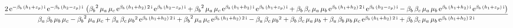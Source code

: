 \documentclass[9pt]{article}
\begin{document}
  \begin{equation}
    \centering
    \frac{2\, \mathrm{e}^{- \mathrm{\beta}_{b}\, \left(h_{1} + z_{p}\right)\, \mathrm{i}}\, \mathrm{e}^{- \mathrm{\beta}_{b}\, \left(h_{2} - z_{p}\right)\, \mathrm{i}}\, \left({\mathrm{\beta}_{b}}^2\, \mathrm{\mu}_{a}\, \mathrm{\mu}_{c}\, \mathrm{e}^{\mathrm{\beta}_{b}\, \left(h_{1} + h_{2}\right)\, 2\, \mathrm{i}}\, \mathrm{e}^{\mathrm{\beta}_{b}\, \left(h_{2} - z_{p}\right)\, \mathrm{i}} + {\mathrm{\beta}_{b}}^2\, \mathrm{\mu}_{a}\, \mathrm{\mu}_{c}\, \mathrm{e}^{\mathrm{\beta}_{b}\, \left(h_{1} + h_{2}\right)\, \mathrm{i}}\, \mathrm{e}^{\mathrm{\beta}_{b}\, \left(h_{1} + z_{p}\right)\, \mathrm{i}} + \mathrm{\beta}_{b}\, \mathrm{\beta}_{c}\, \mathrm{\mu}_{a}\, \mathrm{\mu}_{b}\, \mathrm{e}^{\mathrm{\beta}_{b}\, \left(h_{1} + h_{2}\right)\, 2\, \mathrm{i}}\, \mathrm{e}^{\mathrm{\beta}_{b}\, \left(h_{2} - z_{p}\right)\, \mathrm{i}} - \mathrm{\beta}_{b}\, \mathrm{\beta}_{c}\, \mathrm{\mu}_{a}\, \mathrm{\mu}_{b}\, \mathrm{e}^{\mathrm{\beta}_{b}\, \left(h_{1} + h_{2}\right)\, \mathrm{i}}\, \mathrm{e}^{\mathrm{\beta}_{b}\, \left(h_{1} + z_{p}\right)\, \mathrm{i}}\right)}{\mathrm{\beta}_{a}\, \mathrm{\beta}_{b}\, \mathrm{\mu}_{b}\, \mathrm{\mu}_{c} - {\mathrm{\beta}_{b}}^2\, \mathrm{\mu}_{a}\, \mathrm{\mu}_{c} + \mathrm{\beta}_{a}\, \mathrm{\beta}_{c}\, {\mathrm{\mu}_{b}}^2\, \mathrm{e}^{\mathrm{\beta}_{b}\, \left(h_{1} + h_{2}\right)\, 2\, \mathrm{i}} + {\mathrm{\beta}_{b}}^2\, \mathrm{\mu}_{a}\, \mathrm{\mu}_{c}\, \mathrm{e}^{\mathrm{\beta}_{b}\, \left(h_{1} + h_{2}\right)\, 2\, \mathrm{i}} - \mathrm{\beta}_{a}\, \mathrm{\beta}_{c}\, {\mathrm{\mu}_{b}}^2 + \mathrm{\beta}_{b}\, \mathrm{\beta}_{c}\, \mathrm{\mu}_{a}\, \mathrm{\mu}_{b} + \mathrm{\beta}_{a}\, \mathrm{\beta}_{b}\, \mathrm{\mu}_{b}\, \mathrm{\mu}_{c}\, \mathrm{e}^{\mathrm{\beta}_{b}\, \left(h_{1} + h_{2}\right)\, 2\, \mathrm{i}} + \mathrm{\beta}_{b}\, \mathrm{\beta}_{c}\, \mathrm{\mu}_{a}\, \mathrm{\mu}_{b}\, \mathrm{e}^{\mathrm{\beta}_{b}\, \left(h_{1} + h_{2}\right)\, 2\, \mathrm{i}}}
    \label{eq:X1}
  \end{equation}
\end{document}
